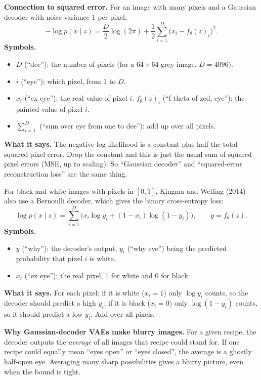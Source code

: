 \textbf{Connection to squared error.} For an image with many pixels and a Gaussian decoder with noise variance 1 per pixel,
\[
-\log p(x \mid z) = \frac{D}{2}\log(2\pi) + \frac{1}{2}\sum_{i=1}^{D}\big(x_i - f_\theta(z)_i\big)^2.
\]
\textbf{Symbols.}
\begin{itemize}[leftmargin=1.5em, itemsep=0pt]
\item $D$ (``dee''): the number of pixels (for a $64 \times 64$ grey image, $D = 4096$).
\item $i$ (``eye''): which pixel, from 1 to $D$.
\item $x_i$ (``ex eye''): the real value of pixel $i$. $f_\theta(z)_i$ (``f theta of zed, eye''): the painted value of pixel $i$.
\item $\sum_{i=1}^{D}$ (``sum over eye from one to dee''): add up over all pixels.
\end{itemize}
\textbf{What it says.} The negative log likelihood is a constant plus half the total squared pixel error. Drop the constant and this is just the usual sum of squared pixel errors (MSE, up to scaling). So ``Gaussian decoder'' and ``squared-error reconstruction loss'' are the same thing.

For black-and-white images with pixels in $[0,1]$, Kingma and Welling (2014) also use a Bernoulli decoder, which gives the binary cross-entropy loss:
\[
\log p(x \mid z) = \sum_{i=1}^{D}\Big(x_i \log y_i + (1 - x_i)\log(1 - y_i)\Big), \qquad y = f_\theta(z).
\]
\textbf{Symbols.}
\begin{itemize}[leftmargin=1.5em, itemsep=0pt]
\item $y$ (``why''): the decoder's output, $y_i$ (``why eye'') being the predicted probability that pixel $i$ is white.
\item $x_i$ (``ex eye''): the real pixel, 1 for white and 0 for black.
\end{itemize}
\textbf{What it says.} For each pixel: if it is white ($x_i = 1$) only $\log y_i$ counts, so the decoder should predict a high $y_i$; if it is black ($x_i = 0$) only $\log(1 - y_i)$ counts, so it should predict a low $y_i$. Add over all pixels.

\textbf{Why Gaussian-decoder VAEs make blurry images.} For a given recipe, the decoder outputs the \emph{average} of all images that recipe could stand for. If one recipe could equally mean ``eyes open'' or ``eyes closed'', the average is a ghostly half-open eye. Averaging many sharp possibilities gives a blurry picture, even when the bound is tight.

